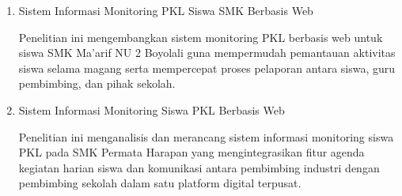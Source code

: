 \begin{enumerate}[label=\arabic*.]
\par\noindent Penelitian ini merancang sistem informasi monitoring peserta magang berbasis web pada divisi Sales \& Business Development di Mayar Kota Bandung. Sistem ini berfokus pada pemantauan progres harian peserta magang serta penyederhanaan rekapitulasi data kehadiran dan kinerja secara terpusat.
\item Sistem Informasi Monitoring PKL Siswa SMK Berbasis Web \cite{ref12}
\par\noindent Penelitian ini mengembangkan sistem monitoring PKL berbasis web untuk siswa SMK Ma'arif NU 2 Boyolali guna mempermudah pemantauan aktivitas siswa selama magang serta mempercepat proses pelaporan antara siswa, guru pembimbing, dan pihak sekolah.
\item Sistem Informasi Monitoring Siswa PKL Berbasis Web \cite{ref13}
\par\noindent Penelitian ini menganalisis dan merancang sistem informasi monitoring siswa PKL pada SMK Permata Harapan yang mengintegrasikan fitur agenda kegiatan harian siswa dan komunikasi antara pembimbing industri dengan pembimbing sekolah dalam satu platform digital terpusat.
\end{enumerate}
